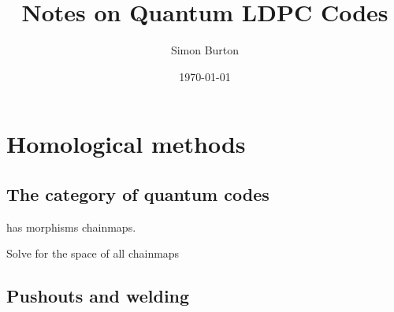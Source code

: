 \documentclass[12pt]{article}
\begin{document}
\title{Notes on Quantum LDPC Codes}

\author{Simon Burton}

\date{\today}


\maketitle




\def\Complex{\mathbb{C}}
\def\C{\mathbb{C}}
\def\R{\mathbb{R}}
\def\Z{\mathbb{Z}}
\def\Ham{H}
\def\Pauli{\mathcal{P}}
\def\Spec{\mbox{Spec}}
\def\Proveit{{\it (Proof??)}}
\def\GL{\mathrm{GL}}
\def\half{\frac{1}{2}}
\def\Im{\mbox{im}}
\def\Ker{\mbox{ker}}
\def\Field{\mathcal{F}}
\def\Defn#1{{\bf #1}}

\newcommand{\ket}[1]{|{#1}\rangle}
\newcommand{\expect}[1]{\langle{#1}\rangle}
\newcommand{\bra}[1]{\langle{#1}|}
\newcommand{\ketbra}[2]{\ket{#1}\!\bra{#2}}
\newcommand{\braket}[2]{\langle{#1}|{#2}\rangle}


%
%

\section{Homological methods}

\subsection{The category of quantum codes}

has morphisms chainmaps.

Solve for the space of all chainmaps

\subsection{Pushouts and welding}

\cite{michnicki2014}
\end{document}
